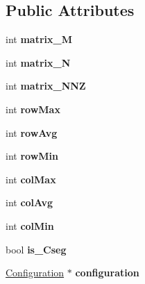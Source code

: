 \subsection*{Public Attributes}
\begin{DoxyCompactItemize}
\item 
\hypertarget{classResult_ad90fd8872d7c9429f28275ed708496cd}{
int {\bfseries matrix\_\-M}}
\label{classResult_ad90fd8872d7c9429f28275ed708496cd}

\item 
\hypertarget{classResult_a6dfcad37c4f4f6bd3a865d50e8e0130b}{
int {\bfseries matrix\_\-N}}
\label{classResult_a6dfcad37c4f4f6bd3a865d50e8e0130b}

\item 
\hypertarget{classResult_a30928aeb2ac524d5f60f307ca058450e}{
int {\bfseries matrix\_\-NNZ}}
\label{classResult_a30928aeb2ac524d5f60f307ca058450e}

\item 
\hypertarget{classResult_af035e8ca1f67ddafa5afe98fd73058a4}{
int {\bfseries rowMax}}
\label{classResult_af035e8ca1f67ddafa5afe98fd73058a4}

\item 
\hypertarget{classResult_ac7d51cf1315500e193fc02177dd9ae19}{
int {\bfseries rowAvg}}
\label{classResult_ac7d51cf1315500e193fc02177dd9ae19}

\item 
\hypertarget{classResult_acceb25d44896f0828d8df541e5e34136}{
int {\bfseries rowMin}}
\label{classResult_acceb25d44896f0828d8df541e5e34136}

\item 
\hypertarget{classResult_a0de92f0fd2f97204895890d28c66d191}{
int {\bfseries colMax}}
\label{classResult_a0de92f0fd2f97204895890d28c66d191}

\item 
\hypertarget{classResult_aa97ebcdac8e1b7f661ef4814aff95441}{
int {\bfseries colAvg}}
\label{classResult_aa97ebcdac8e1b7f661ef4814aff95441}

\item 
\hypertarget{classResult_a4d874b6ce4aad1088ed107fe5068d381}{
int {\bfseries colMin}}
\label{classResult_a4d874b6ce4aad1088ed107fe5068d381}

\item 
\hypertarget{classResult_af6746447e5952d059a22f8610b994122}{
bool {\bfseries is\_\-Cseg}}
\label{classResult_af6746447e5952d059a22f8610b994122}

\item 
\hypertarget{classResult_a6d4c85096335bd8ced0213269bee9a8b}{
\hyperlink{classConfiguration}{Configuration} $\ast$ {\bfseries configuration}}
\label{classResult_a6d4c85096335bd8ced0213269bee9a8b}


\end{DoxyCompactItemize}
